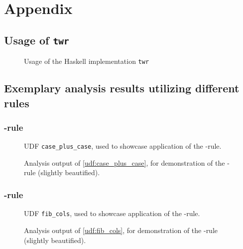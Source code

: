 \cleardoublepage
\renewcommand{\thesection}{\Alph{section}}%

\chapter[Appendix]{Appendix}

\section{Usage of \texttt{twr}}
\begin{figure}[h!]
    \centering
    
    \caption{Usage of the Haskell implementation \texttt{twr}}
\end{figure}

\section{Exemplary analysis results utilizing different rules}
\subsection{\REXPR-rule}
\begin{figure}[h!]
    \centering
    
    \caption{UDF \texttt{case\_plus\_case}, used to showcase application of the \REXPR-rule.}
    \label{udf:case_plus_case}
\end{figure}

\begin{figure}[h!]
    \centering
    
    \caption{Analysis output of \autoref{udf:case_plus_case}, for demonstration of the \REXPR-rule (slightly beautified).}
    \label{scenarios:case_plus_case}
\end{figure}
\FloatBarrier

\subsection{\RSELECT-rule}
\begin{figure}[h!]
    \centering
    
    \caption{UDF \texttt{fib\_cols}, used to showcase application of the \RSELECT-rule.}
    \label{udf:fib_cols}
\end{figure}

\begin{figure}[h!]
    \centering
    
    \caption{Analysis output of \autoref{udf:fib_cols}, for demonstration of the \RSELECT-rule (slightly beautified).}
    \label{scenarios:fib_cols}
\end{figure}
\FloatBarrier

